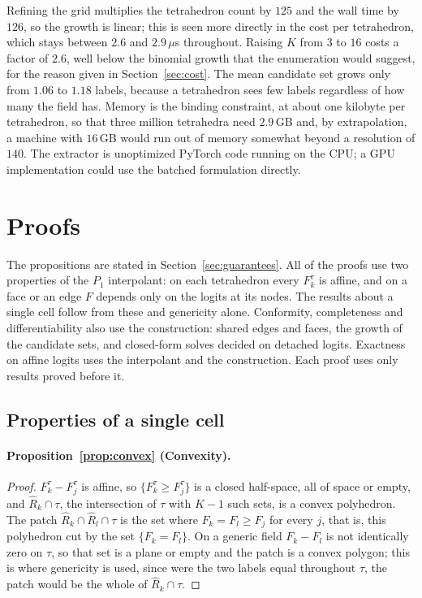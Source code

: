 \documentclass[11pt]{article}
\theoremstyle{definition}
\newcommand{\tet}{\tau}
\newcommand{\interp}{F}
\newcommand{\dregion}[1]{\widehat{R}_{#1}}
\begin{document}
Refining the grid multiplies the tetrahedron count by $125$ and the wall time
by $126$, so the growth is linear; this is seen more directly in the cost per
tetrahedron, which stays between $2.6$ and $2.9\,\mu$s throughout. Raising
$K$ from $3$ to $16$ costs a factor of $2.6$, well below the binomial growth
that the enumeration would suggest, for the reason given in
Section~\ref{sec:cost}. The mean candidate set grows only from $1.06$ to
$1.18$ labels, because a tetrahedron sees few labels regardless of how many
the field has. Memory is the binding constraint, at about one kilobyte per
tetrahedron, so that three million tetrahedra need $2.9$\,GB and, by
extrapolation, a machine with $16$\,GB would run out of memory somewhat
beyond a resolution of $140$. The
extractor is unoptimized PyTorch code running on the CPU; a GPU
implementation could use the batched formulation directly.

\section{Proofs}
\label{sec:proofs-supp}

The propositions are stated in Section~\ref{sec:guarantees}. All of the proofs
use two properties of the $P_1$ interpolant: on each tetrahedron every
$\interp^\tet_k$ is affine, and on a face or an edge $\interp$ depends only on
the logits at its nodes. The results about a single cell follow from these and
genericity alone. Conformity, completeness and differentiability also use the
construction: shared edges and faces, the growth of the candidate sets, and
closed-form solves decided on detached logits. Exactness on affine logits
uses the interpolant and the construction. Each proof uses only results
proved before it.

\subsection{Properties of a single cell}
\label{sec:proofs-cell}

\paragraph*{Proposition~\ref{prop:convex} (Convexity).}
\begin{proof}
$\interp^\tet_k - \interp^\tet_j$ is affine, so
$\{\interp^\tet_k \ge \interp^\tet_j\}$ is a closed half-space, all of space
or empty, and $\dregion{k}\cap\tet$, the intersection of $\tet$ with $K-1$
such sets, is a convex polyhedron. The patch
$\dregion{k}\cap\dregion{l}\cap\tet$ is the set where
$\interp_k = \interp_l \ge \interp_j$ for every $j$, that is, this polyhedron
cut by the set $\{\interp_k=\interp_l\}$. On a generic field
$\interp_k - \interp_l$ is not identically zero on $\tet$, so that set is a
plane or empty and the patch is a convex polygon; this is where genericity is
used, since were the two labels equal throughout $\tet$, the patch would be
the whole of $\dregion{k}\cap\tet$.
\end{proof}
\end{document}
